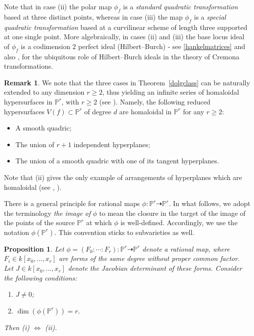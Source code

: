 \documentclass[11pt]{article}   %
\newtheorem{Proposition}[Theorem]{Proposition}
\theoremstyle{definition}
\newtheorem{Remark}[Theorem]{Remark}
\numberwithin{Theorem}{section} \numberwithin{equation}{section}
\newcommand{\p}{{\mathbb P}}
\begin{document}
{Note that in case (ii) the polar map $\phi_f$ is a {\it standard
quadratic transformation\/} based at three distinct points, whereas
in case (iii) the map $\phi_f$ is a {\it special quadratic
transformation\/} based at a curvilinear scheme of length three
supported at one single point. More algebraically, in cases (ii) and
(iii) the base locus ideal of $\phi_f$ is a codimension $2$ perfect
ideal (Hilbert--Burch) - see \ref{hankelmatrices} and also
\cite{cremona}, \cite{Simis2} for the ubiquitous role of
Hilbert--Burch ideals in the theory of Cremona transformations.

\begin{Remark}\label{ext} We note that the three cases in Theorem~\ref{dolgclass}
can be naturally extended to any dimension $r\geq 2$, thus yielding
an infinite series of homaloidal hypersurfaces in $\p^ r$, with
$r\geq 2$ (see  \cite {Dolgachev}). Namely, the following reduced hypersurfaces
$V(f)\subset\p^r$ of degree $d$ are homaloidal in $\p^ r$ for any
$r\geq 2$:
\begin {itemize}
\item[{\rm (i)}]  A smooth quadric{\rm ;}
\item[{\rm (ii)}] The union of $r+1$ independent hyperplanes{\rm ;}
\item[{\rm (iii)}] The union of a smooth quadric with
one of its tangent hyperplanes.
\end {itemize}
Note that (ii) gives the only example of arrangements of hyperplanes
which are homaloidal (see \cite {DP} , \cite {Dolgachev}).
\end{Remark}
\medskip



There is a general principle for rational maps
$\phi:\p^r\dasharrow\p^r$. In what follows, we adopt the terminology
{\it the image of\/}  $\phi$ to mean the closure in the target of
the image of the points of the source $\p^r$ at which $\phi$ is
well-defined. Accordingly, we use the notation $\phi(\p^r)$. This
convention sticks to subvarieties as well.

\begin{Proposition}\label{jacobian}
Let $\phi=(F_0:\cdots :F_r):\p^r\dasharrow \p^r$ denote a rational
map, where $F_i\in k[x_0,\ldots,x_r]$ are forms of the same degree
without proper common factor. Let $J\in k[x_0,\ldots,x_r]$ denote
the Jacobian determinant of these forms. Consider the following
conditions:
\begin {enumerate}
\item[{\rm (i)}]  $J\neq 0${\rm ;}
\item[{\rm (ii)}] $\dim (\phi(\p^r))=r$.
\end {enumerate}
Then {\rm (i)} $\Leftrightarrow$ {\rm (ii)}.


\end{Proposition}}
\end{document}
